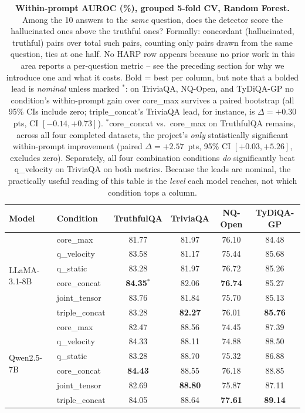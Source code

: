 \documentclass[11pt,a4paper]{article}
\begin{document}
\begin{table}[h]
\centering\small
\begin{tabular}{llcccc}
\toprule
\textbf{Model} & \textbf{Condition} & \textbf{TruthfulQA} & \textbf{TriviaQA} & \textbf{NQ-Open} & \textbf{TyDiQA-GP} \\
\midrule
\multirow{6}{*}{LLaMA-3.1-8B}
  & core\_max      & 81.77 & 81.97 & 76.10 & 84.48 \\
  & q\_velocity    & 83.58 & 81.17 & 75.44 & 85.68 \\
  & q\_static      & 83.28 & 81.97 & 76.72 & 85.26 \\
  & core\_concat   & \textbf{84.35}$^{*}$ & 82.06 & \textbf{76.74} & 85.27 \\
  & joint\_tensor  & 83.76 & 81.84 & 75.70 & 85.13 \\
  & triple\_concat & 83.28 & \textbf{82.27} & 76.01 & \textbf{85.76} \\
\midrule
\multirow{6}{*}{Qwen2.5-7B}
  & core\_max      & 82.47 & 88.56 & 74.45 & 87.39 \\
  & q\_velocity    & 84.33 & 88.11 & 74.88 & 88.50 \\
  & q\_static      & 83.28 & 88.70 & 75.32 & 86.88 \\
  & core\_concat   & \textbf{84.43} & 88.55 & 76.18 & 88.85 \\
  & joint\_tensor  & 82.69 & \textbf{88.80} & 75.87 & 87.11 \\
  & triple\_concat & 84.05 & 88.64 & \textbf{77.61} & \textbf{89.14} \\
\bottomrule
\end{tabular}
\caption{\textbf{Within-prompt AUROC (\%), grouped 5-fold CV, Random Forest.} Among the 10 answers
to the \emph{same} question, does the detector score the hallucinated ones above the truthful
ones? Formally: concordant (hallucinated, truthful) pairs over total such pairs, counting only
pairs drawn from the same question, ties at one half. No HARP row appears because no prior work in
this area reports a per-question metric -- see the preceding section for why we introduce one and
what it costs. Bold = best per column, but note that a bolded lead is
\emph{nominal} unless marked $^{*}$: on TriviaQA, NQ-Open, and TyDiQA-GP no condition's
within-prompt gain over core\_max survives a paired bootstrap (all 95\% CIs include zero;
triple\_concat's TriviaQA lead, for instance, is $\Delta=+0.30$~pts, CI $[-0.14, +0.73]$).
$^{*}$core\_concat vs.\ core\_max on TruthfulQA remains, across all four completed datasets,
the project's \emph{only} statistically significant within-prompt improvement (paired
$\Delta=+2.57$~pts, 95\% CI $[+0.03, +5.26]$, excludes zero). Separately, all four
combination conditions \emph{do} significantly beat q\_velocity on TriviaQA on both metrics.
Because the leads are nominal, the practically useful reading of this table is the \emph{level}
each model reaches, not which condition tops a column.}
\end{table}
\end{document}
